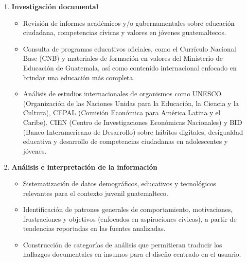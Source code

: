 \begin{enumerate}
      \item \textbf{Investigación documental}
            \begin{itemize}
                  \item Revisión de informes académicos y/o gubernamentales sobre educación ciudadana,
                        competencias cívicas y valores en jóvenes guatemaltecos.
                  \item Consulta de programas educativos oficiales, como el Currículo Nacional Base
                        (CNB) y materiales de formación en valores del Ministerio de Educación de
                        Guatemala, así como contenido internacional enfocado en brindar una educación
                        más completa.
                  \item Análisis de estudios internacionales de organismos como UNESCO (Organización de
                        las Naciones Unidas para la Educación, la Ciencia y la Cultura), CEPAL
                        (Comisión Económica para América Latina y el Caribe), CIEN (Centro de
                        Investigaciones Económicas Nacionales) y BID (Banco Interamericano de
                        Desarrollo) sobre hábitos digitales, desigualdad educativa y desarrollo de
                        competencias ciudadanas en adolescentes y jóvenes.
            \end{itemize}

      \item \textbf{Análisis e interpretación de la información}
            \begin{itemize}
                  \item Sistematización de datos demográficos, educativos y tecnológicos relevantes
                        para el contexto juvenil guatemalteco.
                  \item Identificación de patrones generales de comportamiento, motivaciones,
                        frustraciones y objetivos (enfocados en aspiraciones cívicas), a partir de
                        tendencias reportadas en las fuentes analizadas.
                  \item Construcción de categorías de análisis que permitieran traducir los hallazgos
                        documentales en insumos para el diseño centrado en el usuario.
            \end{itemize}


\end{enumerate}
